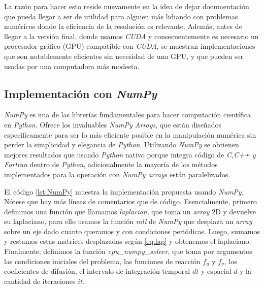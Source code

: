 La razón para hacer esto reside nuevamente en la idea de dejar documentación que pueda llegar a ser de utilidad para alguien más lidiando 
con problemas numéricos donde la eficiencia de la resolución es relevante. Además, antes de llegar a la versión final, donde usamos \textit{CUDA} y 
consecuentemente es necesario un procesador gráfico (GPU) compatible con \textit{CUDA}, se muestran implementaciones que son notablemente eficientes sin necesidad 
de una GPU, y que pueden ser usadas por una computadora más modesta.

\subsection{Implementación con \textit{NumPy}}
\label{SS:NumPy}
\textit{NumPy} es una de las librerías fundamentales para hacer computación científica en \textit{Python}. Ofrece los invaluables \textit{NumPy Arrays}, que están diseñados 
específicamente para ser lo más eficiente posible en la manipulación numérica sin perder la simplicidad y elegancia de \textit{Python}. Utilizando \textit{NumPy} 
se obtienen mejores resultados que usando \textit{Python} nativo porque integra código de \textit{C,C++ y Fortran} dentro de \textit{Python}, adicionalmente la mayoría 
de los métodos implementados para la operación con \textit{NumPy arrays} están paralelizados.

El código \ref{lst:NumPy} muestra la implementación propuesta usando \textit{NumPy}. Nótese que hay más líneas de comentarios que de código. Esencialmente, 
primero definimos una función que llamamos \textit{laplacian}, que toma un \textit{array} 2D 
y devuelve su laplaciano, para ello usamos la función \textit{roll} de \textit{NumPy} que desplaza un \textit{array} sobre un eje dado
cuanto queramos y con condiciones periódicas.
Luego, sumamos y restamos estas matrices desplazadas según \ref{eq:lap} y obtenemos el laplaciano. Finalmente, definimos la función \textit{cpu\_numpy\_solver}, que toma 
por argumentos las condiciones iniciales del problema, las funciones de reacción $f_u$ y $f_v$, los coeficientes de difusión, 
el intervalo de integración temporal $dt$ y espacial $d$ y la cantidad de iteraciones $it$. 

